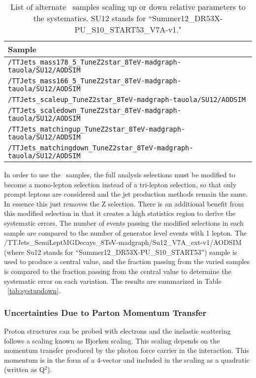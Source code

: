 \begin{table}[h]
\begin{center}
\caption{\small\label{tab:sampleupdown} List of alternate \ttbar \ samples scaling up or down relative parameters to the systematics. SU12 stands for ``Summer12\_DR53X-PU\_S10\_START53\_V7A-v1."}
\begin{tabular}{l}\hline
Sample   \\ \hline
 \verb=/TTJets_mass178_5_TuneZ2star_8TeV-madgraph-tauola/SU12/AODSIM=   \\
 \verb=/TTJets_mass166_5_TuneZ2star_8TeV-madgraph-tauola/SU12/AODSIM=   \\  %
 \verb=/TTJets_scaleup_TuneZ2star_8TeV-madgraph-tauola/SU12/AODSIM=  \\
 \verb=/TTJets_scaledown_TuneZ2star_8TeV-madgraph-tauola/SU12/AODSIM=  \\ %
 \verb=/TTJets_matchingup_TuneZ2star_8TeV-madgraph-tauola/SU12/AODSIM=  \\
 \verb=/TTJets_matchingdown_TuneZ2star_8TeV-madgraph-tauola/SU12/AODSIM=  \\
\hline
\end{tabular}
\end{center}
\end{table}

In order to use the \ttbar \ samples, the full analysis selections must be modified to become a mono-lepton selection instead of a tri-lepton selection, so that only prompt leptons are considered and the jet production methods remain the same. In essence this just removes the Z selection. There is an additional benefit from this modified selection in that it creates a high statistics region to derive the systematic errors. The number of events passing the modified selections in each sample are compared to the number of generator level events with 1 lepton. The /TTJets\_SemiLeptMGDecays\_8TeV-madgraph/Su12\_V7A\_ext-v1/AODSIM  (where Su12 stands for ``Summer12\_DR53X-PU\_S10\_START53'') sample is used to produce a central value, and the fraction passing from the varied samples is compared to the fraction passing from the central value to determine the systematic error on each variation. The results are summarized in Table ~\ref{tab:systupdown}.

\subsubsection{Uncertainties Due to Parton Momentum Transfer}
Proton structures can be probed with electrons and the inelastic scattering follows a scaling known as Bjorken scaling. This scaling depends on the momentum transfer produced by the photon force carrier in the interaction. This momentum is in the form of a 4-vector and included in the scaling as a quadratic (written as Q$^2$).\\

